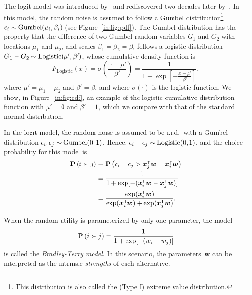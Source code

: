The logit model was introduced by~\citet{zermelo1928berechnung} and rediscovered two decades later by~\citet{bradley1952rank}.
In this model, the random noise is assumed to follow a Gumbel distribution\footnote{This distribution is also called the (Type I) extreme value distribution.} $\epsilon_i \sim \mathrm{Gumbel}( \mu_i, \beta_i )$ (see Figure~\ref{in:fig:pdf}).
The Gumbel distribution has the property that the difference of two Gumbel random variables $G_1$ and $G_2$ with locations $\mu_1$ and $\mu_2$, and scales $\beta_1 = \beta_2 = \beta$, follows a logistic distribution $G_1 - G_2 \sim \mathrm{Logistic}( \mu', \beta' )$, whose cumulative density function is
\begin{equation*}
	F_{\text{Logistic}}(x)
	= \sigma\left(\frac{x - \mu'}{\beta'}\right)
	= \frac{1}{1 + \exp \left[ - \frac{x  - \mu'}{\beta'} \right]},
\end{equation*}
where $\mu' = \mu_1 - \mu_2$ and $\beta' = \beta$, and where $\sigma(\cdot)$ is the logistic function.
We show, in Figure~\ref{in:fig:cdf}, an example of the logistic cumulative distribution function with $\mu' = 0$ and $\beta' = 1$, which we compare with that of the standard normal distribution.

In the logit model, the random noise is assumed to be i.i.d.\ with a Gumbel distribution $\epsilon_i, \epsilon_j \sim \mathrm{Gumbel}( 0, 1 )$.
Hence, $\epsilon_i - \epsilon_j \sim \mathrm{Logistic}( 0, 1 )$, and  the choice probability for this model is
\begin{align}
	\label{in:eq:logit}
	\mathbf{P}\left( i \succ j \right) & = \mathbf{P}\left( \epsilon_i - \epsilon_j > \bm{x}_j^\intercal \bm{w} - \bm{x}_i^\intercal \bm{w} \right)              \nonumber \\
	                 & = \frac{1}{1 + \exp[-(\bm{x}_i^\intercal \bm{w} - \bm{x}_j^\intercal \bm{w})]}                        \nonumber \\
	                 & = \frac{\exp(\bm{x}_i^\intercal \bm{w})}{\exp(\bm{x}_i^\intercal \bm{w}) + \exp(\bm{x}_j^\intercal \bm{w})}.
\end{align}

When the random utility is parameterized by only one parameter, the model
\begin{equation}
	\label{in:eq:bradley-terry}
	\mathbf{P}\left( i \succ j \right) = \frac{1}{1 + \exp[-(w_i - w_j)]}
\end{equation}
is called the \emph{Bradley-Terry model}.
In this scenario, the parameters~$\bm{w}$ can be interpreted as the intrinsic \emph{strengths} of each alternative.

